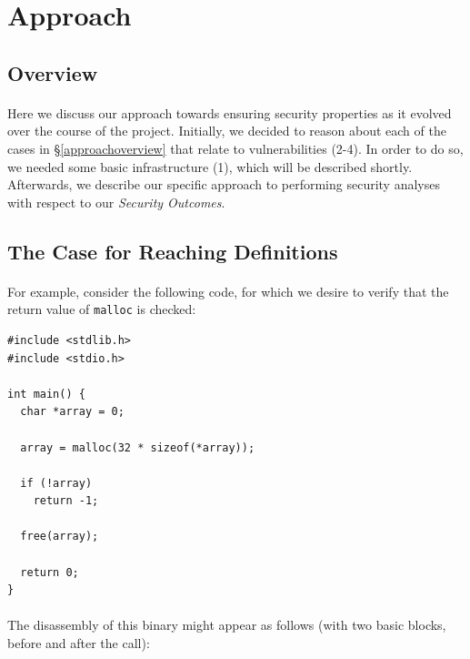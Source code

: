 \documentclass[letterpaper,11pt]{article}
\begin{document}
\section{Approach}

\subsection{Overview}
\paragraph{}
Here we discuss our approach towards ensuring security properties as it evolved
over the course of the project. Initially, we decided to reason about each
of the cases in \S\ref{approachoverview} that relate to vulnerabilities
(2-4). In order to do so, we needed some basic infrastructure (1), which will be
described shortly. Afterwards, we describe our specific approach to performing
security analyses with respect to our \emph{Security Outcomes}.

\subsection{The Case for Reaching Definitions}

\paragraph{}
For example, consider the following code, for which we desire to verify
that the return value of \texttt{malloc} is checked:

\begin{center}
\lstset{language=C, label=malloccheck,
caption=malloc.c, breaklines=true, basicstyle=\tiny, numbers=left}
\begin{lstlisting}
#include <stdlib.h>
#include <stdio.h>

int main() {
  char *array = 0;

  array = malloc(32 * sizeof(*array));

  if (!array)
    return -1;

  free(array);

  return 0;
}
\end{lstlisting}
\end{center}

\paragraph{}
The disassembly of this binary might appear as follows (with two basic blocks,
before and after the call):
\end{document}
